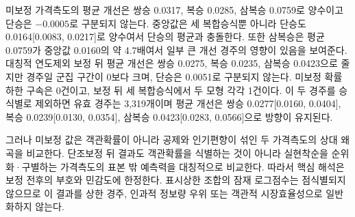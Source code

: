 미보정 가격측도의 평균 개선은 쌍승 0.0317, 복승 0.0285, 삼복승 0.0759로
양수이고 단승은 $-0.0005$로 구분되지 않는다. 중앙값은 세 복합승식뿐 아니라
단승도 0.0164[0.0083, 0.0217]로 양수여서 단승의 평균과 충돌한다. 또한
삼복승은 평균 0.0759가 중앙값 0.0160의 약 4.7배여서 일부 큰 개선 경주의
영향이 있음을 보여준다. 대칭적 연도제외 보정 뒤 평균 개선은 쌍승 0.0275,
복승 0.0235, 삼복승 0.0423으로 줄지만 경주일 군집 구간이 0보다 크며, 단승은
0.0051로 구분되지 않는다. 미보정 확률하한 구속은 0건이고, 보정 뒤 세
복합승식에서 두 모형 각각 1건이다. 이 두 경주를 승식별로 제외하면 유효
경주는 3,319개이며 평균 개선은 쌍승 0.0277[0.0160, 0.0404], 복승
0.0239[0.0130, 0.0354], 삼복승 0.0423[0.0283, 0.0566]으로 방향이 유지된다.

그러나 미보정 값은 객관확률이 아니라 공제와 인기편향이 섞인 두 가격측도의
상대 왜곡을 비교한다. 단조보정 뒤 결과도 객관확률을 식별하는 것이 아니라
실현착순을 순위화·구별하는 가격측도의 표본 밖 예측력을 대칭적으로 비교한다.
따라서 핵심 해석은 보정 전후의 부호와 민감도에 한정한다. 표시상한 조합의 잠재
로그점수는 점식별되지 않으므로 이 결과를 상한 경주, 인과적 정보량 우위 또는
객관적 시장효율성으로 일반화하지 않는다.
